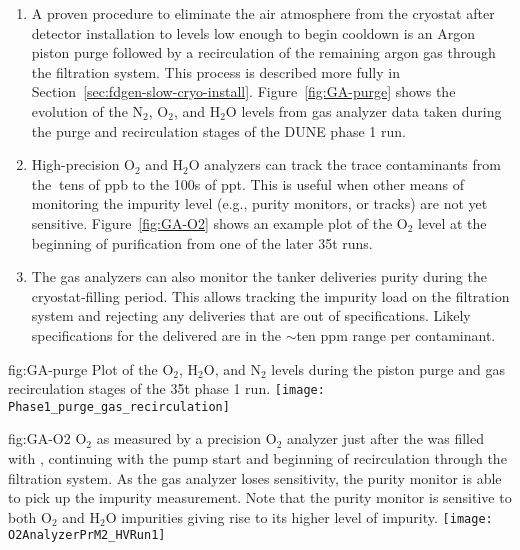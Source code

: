 \begin{enumerate}
\item A proven procedure to eliminate the air atmosphere from the cryostat after detector installation to levels low enough to begin cooldown is an Argon piston purge followed by a recirculation of the remaining argon gas through the filtration system. This process is described more fully in Section~\ref{sec:fdgen-slow-cryo-install}. Figure~\ref{fig:GA-purge} shows the evolution of the $\text{N}_2$, $\text{O}_2$, and $\text{H}_2\text{O}$ levels from gas analyzer data taken during the purge and recirculation stages of the DUNE  %
phase 1 run.

\item High-precision $\text{O}_2$ and $\text{H}_2\text{O}$ analyzers can track the trace contaminants from the $\>$tens of ppb to the \num{100}s of ppt. This is useful when other means of monitoring the impurity level (e.g., purity monitors, or  tracks) are not yet sensitive. Figure~\ref{fig:GA-O2} shows an example plot of the $\text{O}_2$ level at the beginning of  purification from one of the later \num{35}\si{t} %
 runs.

\item The gas analyzers can also monitor the tanker  deliveries purity during the cryostat-filling period. This allows tracking the impurity load on the filtration system and rejecting any deliveries that are out of specifications. Likely specifications for the delivered  are in the $\sim$ten \si{ppm} range per contaminant.

\end{enumerate}

\begin{dunefigure}{fig:GA-purge}
  {Plot of the $\text{O}_2$, $\text{H}_2\text{O}$, and $\text{N}_2$ levels during the piston purge and gas recirculation stages of the \num{35}\si{t} %
  phase 1 run.}
  \texttt{[image: Phase1\_purge\_gas\_recirculation]}%
\end{dunefigure}

\begin{dunefigure}{fig:GA-O2}
  {$\text{O}_2$ as measured by a precision $\text{O}_2$ analyzer just after the  %
  was filled with , continuing with the  pump start and beginning of  recirculation through the filtration system. As the gas analyzer loses sensitivity, the purity monitor is able to pick up the impurity measurement. Note that the purity monitor is sensitive to both $\text{O}_2$ and $\text{H}_2\text{O}$ impurities giving rise to its higher level of impurity.}
  \texttt{[image: O2AnalyzerPrM2\_HVRun1]}%
\end{dunefigure}

